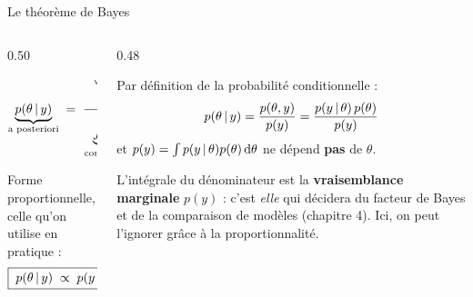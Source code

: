 \begin{frame}{Le théorème de Bayes}
\begin{columns}[t]
\begin{column}{0.50\textwidth}
\begin{tcolorbox}[enhanced,colback=byDeep!6,colframe=byBlue,arc=2mm,
   boxrule=1pt,left=2mm,right=2mm,top=2mm,bottom=2mm]
\centering\large
\[
\underbrace{p(\theta \,\vert\, y)}_{\text{a posteriori}}
\;=\;
\frac{\overbrace{p(y \,\vert\, \theta)}^{\text{vraisemblance}}\;
      \overbrace{p(\theta)}^{\text{a priori}}}
     {\underbrace{\int p(y \,\vert\, \theta')\,p(\theta')\,\mathrm{d}\theta'}_{\text{constante de normalisation}}}
\]
\end{tcolorbox}
\vspace{1mm}
\centering\small Forme proportionnelle, celle qu'on utilise en pratique :
\[\boxed{\;p(\theta \,\vert\, y) \;\propto\; p(y \,\vert\, \theta)\,p(\theta)\;}\]
\end{column}
\begin{column}{0.48\textwidth}
\begin{kbox}
Par définition de la probabilité conditionnelle :
\[
p(\theta \,\vert\, y) = \frac{p(\theta, y)}{p(y)}
= \frac{p(y \,\vert\, \theta)\,p(\theta)}{p(y)}
\]
et $p(y) = \int p(y \,\vert\, \theta)p(\theta)\,\mathrm{d}\theta$
ne dépend \textbf{pas} de $\theta$.
\end{kbox}
\begin{wbox}
L'intégrale du dénominateur est la \textbf{vraisemblance marginale}
$p(y)$ : c'est \emph{elle} qui décidera du facteur de Bayes et de la comparaison
de modèles (chapitre 4). Ici, on peut l'ignorer grâce à la proportionnalité.
\end{wbox}
\end{column}
\end{columns}
\end{frame}

